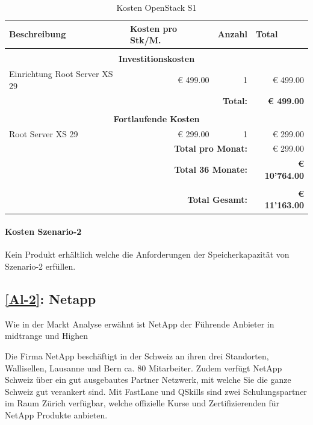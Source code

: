 \begin{table}[htbp]
\caption{Kosten OpenStack S1}
\begin{small}
\begin{tabular}{|l|r|r|r|}
\hline
\textbf{Beschreibung} & \multicolumn{1}{l|}{\textbf{Kosten pro Stk/M.}} & \multicolumn{1}{l|}{\textbf{Anzahl}} & \multicolumn{1}{l|}{\textbf{Total}} \\ \hline
  \multicolumn{ 4}{c}{} \\  \hline
\multicolumn{ 4}{|c|}{\textbf{Investitionskosten}} \\ \hline
Einrichtung Root Server XS 29 & € 499.00 & 1 & € 499.00 \\ \hline \hline
  \multicolumn{ 3}{r|}{\textbf{Total:}}  & \textbf{€ 499.00} \\ 
  \cline{4-4}
\multicolumn{ 4}{c}{} \\   \hline
\multicolumn{ 4}{|c|}{\textbf{Fortlaufende Kosten}} \\ \hline
Root Server XS 29  & € 299.00 & 1 & € 299.00 \\ \hline \hline
  \multicolumn{ 3}{r|}{\textbf{Total pro Monat:}} & € 299.00 \\
\cline{4-4}
  \multicolumn{ 3}{r|}{\textbf{Total 36 Monate:}} & \textbf{€ 10'764.00} \\ \cline{4-4}
  \multicolumn{ 4}{c}{} \\  \cline{4-4}
  \multicolumn{ 3}{r|}{\textbf{Total Gesamt:}} & \textbf{€ 11'163.00} \\ \cline{4-4}
\end{tabular}
\end{small}
\label{KostenOpenStackS1}
\end{table}


\paragraph*{Kosten Szenario-2}
Kein Produkt erhältlich welche die Anforderungen der Speicherkapazität von Szenario-2 erfüllen.

\subsection{\ref{Al-2}: Netapp}

Wie in der Markt Analyse erwähnt ist NetApp der Führende Anbieter in midtrange und Highen

Die Firma NetApp beschäftigt in  der Schweiz an ihren drei Standorten, Wallisellen, Lausanne und Bern ca. 80 Mitarbeiter. Zudem verfügt NetApp Schweiz über ein gut ausgebautes Partner Netzwerk, mit welche Sie die ganze Schweiz gut verankert sind. Mit FastLane und QSkills sind zwei Schulungspartner im Raum Zürich verfügbar, welche offizielle Kurse und Zertifizierenden für NetApp Produkte anbieten. 

